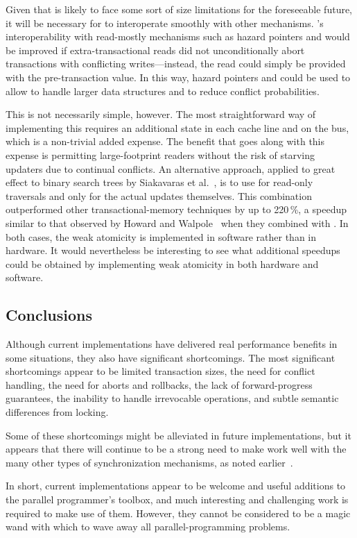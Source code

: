 Given that  is likely to face some sort of size limitations for the
foreseeable future, it will be necessary for  to interoperate
smoothly with other mechanisms.
's interoperability with read-mostly mechanisms such as hazard pointers
and  would be improved if extra-transactional reads did not
unconditionally abort transactions with conflicting writes---instead,
the read could simply be provided with the pre-transaction value.
In this way, hazard pointers and  could be used to allow  to handle
larger data structures and to reduce conflict probabilities.

This is not necessarily simple, however.
The most straightforward way of implementing this requires an additional
state in each cache line and on the bus, which is a non-trivial added
expense.
The benefit that goes along with this expense is permitting
large-footprint readers without the risk of starving updaters due
to continual conflicts.
An alternative approach, applied to great effect to binary search trees
by Siakavaras et al.~\cite{Siakavaras2017CombiningHA},
is to use  for read-only traversals and 
only for the actual updates themselves.
This combination outperformed other transactional-memory techniques by
up to 220\,\%, a speedup similar to that observed by
Howard and Walpole~\cite{PhilHoward2011RCUTMRBTree}
when they combined  with .
In both cases, the weak atomicity is implemented in software rather than
in hardware.
It would nevertheless be interesting to see what additional speedups
could be obtained by implementing weak atomicity in both hardware and
software.

\subsection{Conclusions}
\label{sec:future:Conclusions}

Although current  implementations have delivered real performance
benefits in some situations, they also have significant shortcomings.
The most significant shortcomings appear to be
limited transaction sizes,
the need for conflict handling, the need for aborts and rollbacks,
the lack of forward-progress guarantees,
the inability to handle irrevocable operations,
and subtle semantic differences
from locking.

Some of these shortcomings might be alleviated in future implementations,
but it appears that there will continue to be a strong need to make
 work well with the many other types of synchronization mechanisms,
as noted earlier~\cite{McKenney2007PLOSTM,PaulEMcKenney2010OSRGrassGreener}.

In short, current  implementations appear to be welcome and useful
additions to the parallel programmer's toolbox, and much interesting
and challenging work is required to make use of them.
However, they cannot be
considered to be a magic wand with which to wave away all parallel-programming
problems.
